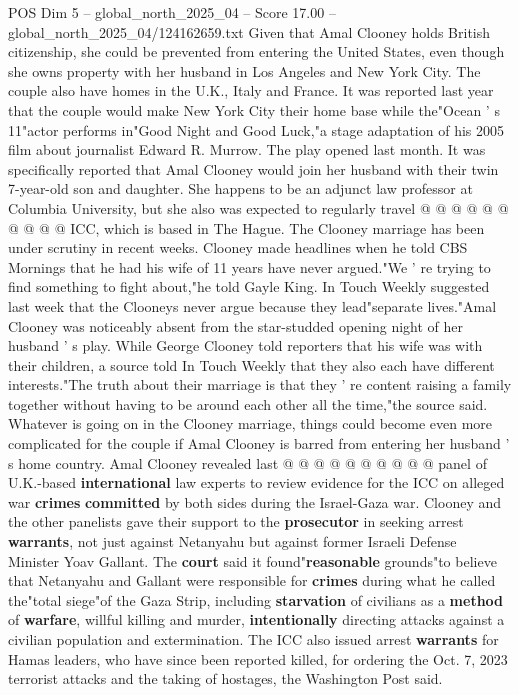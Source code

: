 \begin{textsample}{POS Dim 5 – global\_north\_2025\_04 – Score 17.00 – global\_north\_2025\_04/124162659.txt}
Given that Amal Clooney holds British citizenship, she could be prevented from entering the United States, even though she owns property with her husband in Los Angeles and New York City.
The couple also have homes in the U.K., Italy and France.
It was reported last year that the couple would make New York City their home base while the"Ocean ' s 11"actor performs in"Good Night and Good Luck,"a stage adaptation of his 2005 film about journalist Edward R.
Murrow.
The play opened last month.
It was specifically reported that Amal Clooney would join her husband with their twin 7-year-old son and daughter.
She happens to be an adjunct law professor at Columbia University, but she also was expected to regularly travel @ @ @ @ @ @ @ @ @ @ ICC, which is based in The Hague.
The Clooney marriage has been under scrutiny in recent weeks.
Clooney made headlines when he told CBS Mornings that he had his wife of 11 years have never argued."We ' re trying to find something to fight about,"he told Gayle King.
In Touch Weekly suggested last week that the Clooneys never argue because they lead"separate lives."Amal Clooney was noticeably absent from the star-studded opening night of her husband ' s play.
While George Clooney told reporters that his wife was with their children, a source told In Touch Weekly that they also each have different interests."The truth about their marriage is that they ' re content raising a family together without having to be around each other all the time,"the source said.
Whatever is going on in the Clooney marriage, things could become even more complicated for the couple if Amal Clooney is barred from entering her husband ' s home country.
Amal Clooney revealed last @ @ @ @ @ @ @ @ @ @ panel of U.K.-based \textbf{international} law experts to review evidence for the ICC on alleged war \textbf{crimes} \textbf{committed} by both sides during the Israel-Gaza war.
Clooney and the other panelists gave their support to the \textbf{prosecutor} in seeking arrest \textbf{warrants}, not just against Netanyahu but against former Israeli Defense Minister Yoav Gallant.
The \textbf{court} said it found"\textbf{reasonable} grounds"to believe that Netanyahu and Gallant were responsible for \textbf{crimes} during what he called the"total siege"of the Gaza Strip, including \textbf{starvation} of civilians as a \textbf{method} of \textbf{warfare}, willful killing and murder, \textbf{intentionally} directing attacks against a civilian population and extermination.
The ICC also issued arrest \textbf{warrants} for Hamas leaders, who have since been reported killed, for ordering the Oct. 7, 2023 terrorist attacks and the taking of hostages, the Washington Post said.

\end{textsample}
